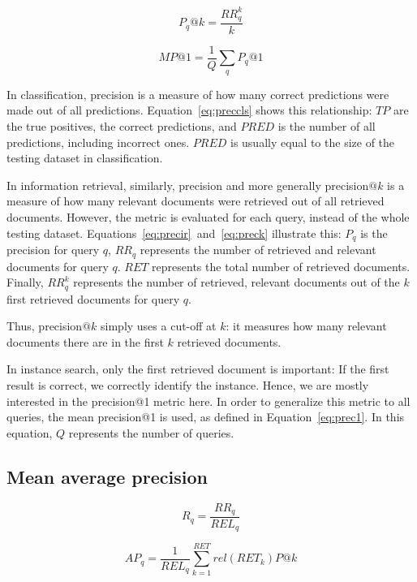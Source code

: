 \begin{equation}\label{eq:preck}
P_q@k = \frac{RR^k_q}{k}
\end{equation}

\begin{equation}\label{eq:prec1}
MP@1 = \frac{1}{Q} \sum_q P_q@1
\end{equation}

In classification, precision is a measure of how many correct predictions
were made out of all predictions. Equation~\ref{eq:preccls} shows this
relationship: $TP$ are the true positives, the correct predictions,
and $PRED$ is the number of all predictions, including incorrect ones.
$PRED$ is usually equal to the size of the testing dataset in classification.

In information retrieval, similarly,
precision and more generally precision$@k$ is a measure of how many
relevant documents were retrieved out of all retrieved documents.
However, the metric is evaluated for each query, instead of the whole
testing dataset.
Equations~\ref{eq:precir}~and~\ref{eq:preck} illustrate this: $P_q$ is
the precision for query $q$, $RR_q$ represents the number of retrieved
and relevant documents for query $q$.
$RET$ represents the total number of retrieved documents. Finally, $RR^k_q$
represents the number of retrieved, relevant documents out of the $k$ first
retrieved documents for query $q$.

Thus, precision$@k$ simply uses a cut-off at $k$: it measures how many
relevant documents there are in the first $k$ retrieved documents.

In instance search, only the first retrieved document is important:
If the first result is correct, we correctly identify the instance.
Hence, we are mostly interested in the precision@1 metric here.
In order to generalize this metric to all queries, the mean precision@1
is used, as defined in Equation~\ref{eq:prec1}. In this equation,
$Q$ represents the number of queries.

\subsection{Mean average precision}
\begin{equation}\label{eq:recall}
R_q = \frac{RR_q}{REL_q}
\end{equation}

\begin{equation}\label{eq:ap}
AP_q = \frac{1}{REL_q} \sum_{k=1}^{RET} rel(RET_k)P@k
\end{equation}

